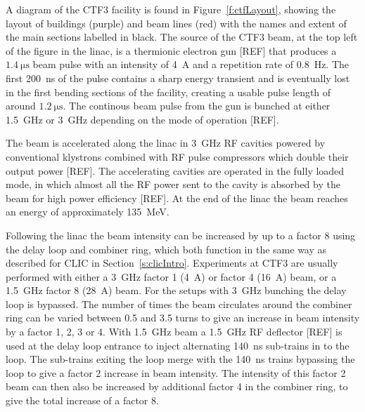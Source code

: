 A diagram of the CTF3 facility is found in Figure~\ref{f:ctfLayout},  showing the layout of buildings (purple) and beam lines (red) with the names and extent of the main sections labelled in black. The source of the CTF3 beam, at the top left of the figure in the linac, is a thermionic electron gun [REF] that produces a \(1.4~\mathrm{\mu s}\) beam pulse with an intensity of 4~A and a repetition rate of 0.8~Hz. The first 200~ns of the pulse contains a sharp energy transient and is eventually lost in the first bending sections of the facility, creating a usable pulse length of around \(1.2~\mathrm{\mu s}\). The continous beam pulse from the gun is bunched at either 1.5~GHz or 3~GHz depending on the mode of operation [REF].


The beam is accelerated along the linac in 3~GHz RF cavities powered by conventional klystrons combined with RF pulse compressors which double their output power [REF]. The accelerating cavities are operated in the fully loaded mode, in which almost all the RF power sent to the cavity is absorbed by the beam for high power efficiency [REF]. At the end of the linac the beam reaches an energy of approximately 135~MeV.

Following the linac the beam intensity can be increased by up to a factor 8 using the delay loop and combiner ring, which both function in the same way as described for CLIC in Section~\ref{s:clicIntro}. Experiments at CTF3 are usually performed with either a 3~GHz factor 1 (4~A) or factor 4 (16~A) beam, or a 1.5~GHz factor 8 (28~A) beam. For the setups with 3~GHz bunching the delay loop is bypassed. The number of times the beam circulates around the combiner ring can be varied between 0.5 and 3.5 turns to give an increase in beam intensity by a factor 1, 2, 3 or 4. With 1.5~GHz beam a 1.5~GHz RF deflector [REF] is used at the delay loop entrance to inject alternating 140~ns sub-trains in to the loop. The sub-trains exiting the loop merge with the 140~ns trains bypassing the loop to give a factor 2 increase in beam intensity. The intensity of this factor 2 beam can then also be increased by additional factor 4 in the combiner ring, to give the total increase of a factor 8.

